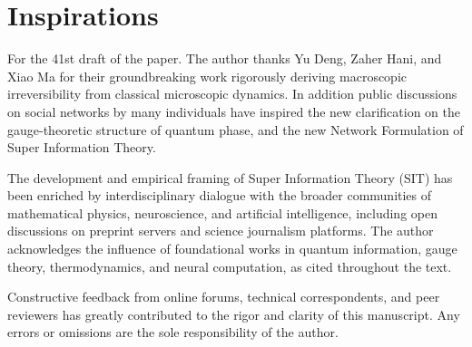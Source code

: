 \setcounter{subsection}{0}
\section*{Inspirations}
For the 41st draft of the paper. The author thanks Yu Deng, Zaher Hani, and Xiao Ma for their groundbreaking work rigorously deriving macroscopic irreversibility from classical microscopic dynamics. In addition public discussions on social networks by many individuals have inspired the new clarification on the gauge-theoretic structure of quantum phase, and the new Network Formulation of Super Information Theory. 

The development and empirical framing of Super Information Theory (SIT) has been enriched by interdisciplinary dialogue with the broader communities of mathematical physics, neuroscience, and artificial intelligence, including open discussions on preprint servers and science journalism platforms. The author acknowledges the influence of foundational works in quantum information, gauge theory, thermodynamics, and neural computation, as cited throughout the text.

Constructive feedback from online forums, technical correspondents, and peer reviewers has greatly contributed to the rigor and clarity of this manuscript. Any errors or omissions are the sole responsibility of the author.

